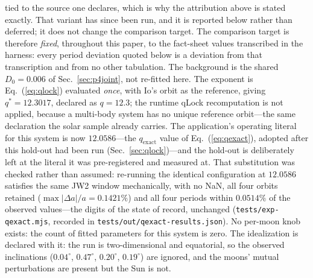 \documentclass[aps,reprint,amsmath,amssymb,nofootinbib,superscriptaddress,floatfix]{revtex4-2}
\begin{document}
tied to the source one declares, which is why the attribution above is
stated exactly.
That variant has since been run, and it is reported below rather than
deferred; it does not change the comparison target.
The comparison target is therefore \emph{fixed}, throughout this paper,
to the fact-sheet values transcribed in the harness: every period
deviation quoted below is a deviation from that transcription and from
no other tabulation.
The background is the shared $D_0=0.006$ of Sec.~\ref{sec:p4joint},
not re-fitted here.
The exponent is Eq.~(\ref{eq:qlock}) evaluated \emph{once}, with Io's
orbit as the reference, giving $q^{*}=12.3017$, declared as $q=12.3$;
the runtime qLock recomputation is not applied, because a multi-body
system has no unique reference orbit---the same declaration the solar
sample already carries.
The application's operating literal for this system is now
$12.0586$---the $q_{\mathrm{exact}}$ value of Eq.~(\ref{eq:qexact}),
adopted after this hold-out had been run (Sec.~\ref{sec:qlock})---and
the hold-out is deliberately left at the literal it was pre-registered
and measured at.
That substitution was checked rather than assumed: re-running the
identical configuration at $12.0586$ satisfies the same JW2 window
mechanically, with no NaN, all four orbits retained
($\max|\Delta a|/a=0.1421\%$) and all four periods within $0.0514\%$ of
the observed values---the digits of the state of record, unchanged
(\texttt{tests/exp-qexact.mjs}, recorded in
\texttt{tests/out/qexact-results.json}).
No per-moon knob exists: the count of fitted parameters for this
system is zero.
The idealization is declared with it: the run is two-dimensional and
equatorial, so the observed inclinations
($0.04^{\circ}$, $0.47^{\circ}$, $0.20^{\circ}$, $0.19^{\circ}$) are
ignored, and the moons' mutual perturbations are present but the Sun
is not.
\end{document}
